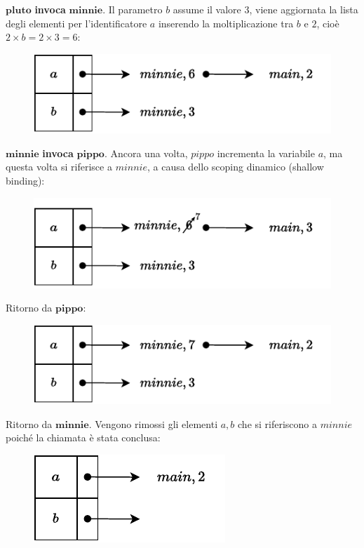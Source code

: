 \documentclass[a4paper]{article}
\begin{document}
	\noindent
	$\mathbf{pluto}$\textbf{ invoca }$\mathbf{minnie}$. Il parametro $b$ assume il valore $3$, viene aggiornata la lista degli elementi per l'identificatore $a$ inserendo la moltiplicazione tra $b$ e $2$, cioè $2 \times b = 2 \times 3 = 6$:
	\begin{figure}[!htp]
		\centering
		\includegraphics[width=.8\textwidth]{img/ex3-010.pdf}
	\end{figure}
	
	\noindent
	$\mathbf{minnie}$\textbf{ invoca }$\mathbf{pippo}$. Ancora una volta, $pippo$ incrementa la variabile $a$, ma questa volta si riferisce a $minnie$, a causa dello scoping dinamico (shallow binding):
	\begin{figure}[!htp]
		\centering
		\includegraphics[width=.8\textwidth]{img/ex3-011.pdf}
	\end{figure}
	
	\noindent
	Ritorno da $\mathbf{pippo}$:
	\begin{figure}[!htp]
		\centering
		\includegraphics[width=.8\textwidth]{img/ex3-012.pdf}
	\end{figure}
	
	\noindent
	Ritorno da $\mathbf{minnie}$. Vengono rimossi gli elementi $a,b$ che si riferiscono a $minnie$ poiché la chiamata è stata conclusa:
	\begin{figure}[!htp]
		\centering
		\includegraphics[width=.5\textwidth]{img/ex3-013.pdf}
	\end{figure}
	
\end{document}
